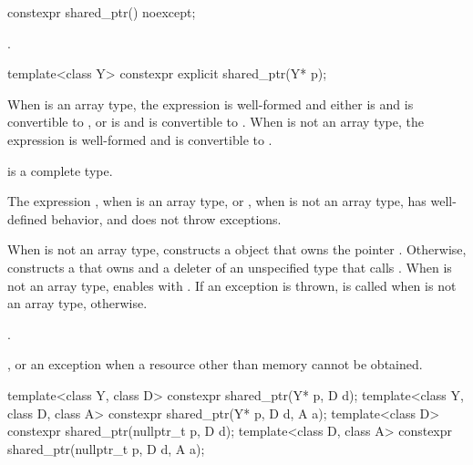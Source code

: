 %
\begin{itemdecl}
constexpr shared_ptr() noexcept;
\end{itemdecl}

\begin{itemdescr}
\pnum
\ensures
{}.
\end{itemdescr}

%
\begin{itemdecl}
template<class Y> constexpr explicit shared_ptr(Y* p);
\end{itemdecl}

\begin{itemdescr}
\pnum
\constraints
When  is an array type,
the expression  is well-formed and either
 is  and  is convertible to , or
 is  and  is convertible to .
When  is not an array type,
the expression  is well-formed and
 is convertible to .

\pnum
\mandates
{} is a complete type.

\pnum
\expects
The expression
, when  is an array type, or
, when  is not an array type,
has well-defined behavior, and
does not throw exceptions.

\pnum
\effects
When  is not an array type,
constructs a  object
that owns the pointer .
Otherwise, constructs a 
that owns  and a deleter of an
unspecified type that calls .
When  is not an array type,
enables  with .
If an exception is thrown,  is called
when  is not an array type,  otherwise.

\pnum
\ensures
{}.

\pnum
\throws
{}, or an  exception when a resource other than memory cannot be obtained.
\end{itemdescr}

%
\begin{itemdecl}
template<class Y, class D> constexpr shared_ptr(Y* p, D d);
template<class Y, class D, class A> constexpr shared_ptr(Y* p, D d, A a);
template<class D> constexpr shared_ptr(nullptr_t p, D d);
template<class D, class A> constexpr shared_ptr(nullptr_t p, D d, A a);
\end{itemdecl}

